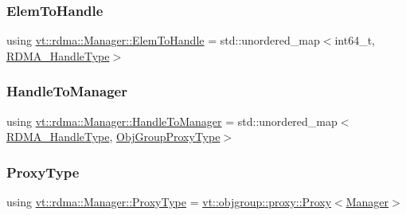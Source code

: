 \mbox{\label{structvt_1_1rdma_1_1_manager_ad794893058cec7595bc2bcb466ce7d3f}} 
\subsubsection{\texorpdfstring{Elem\+To\+Handle}{ElemToHandle}}
{\footnotesize\ttfamily using \hyperlink{structvt_1_1rdma_1_1_manager_ad794893058cec7595bc2bcb466ce7d3f}{vt\+::rdma\+::\+Manager\+::\+Elem\+To\+Handle} =  std\+::unordered\+\_\+map$<$int64\+\_\+t, \hyperlink{namespacevt_a10442579ec4e7ebef223818e64bcf908}{R\+D\+M\+A\+\_\+\+Handle\+Type}$>$}

\mbox{\label{structvt_1_1rdma_1_1_manager_aac6e7c58d320c302ea08461941d65f6e}} 
\subsubsection{\texorpdfstring{Handle\+To\+Manager}{HandleToManager}}
{\footnotesize\ttfamily using \hyperlink{structvt_1_1rdma_1_1_manager_aac6e7c58d320c302ea08461941d65f6e}{vt\+::rdma\+::\+Manager\+::\+Handle\+To\+Manager} =  std\+::unordered\+\_\+map$<$\hyperlink{namespacevt_a10442579ec4e7ebef223818e64bcf908}{R\+D\+M\+A\+\_\+\+Handle\+Type}, \hyperlink{namespacevt_ad7cae989df485fccca57f0792a880a8e}{Obj\+Group\+Proxy\+Type}$>$}

\mbox{\label{structvt_1_1rdma_1_1_manager_a75d5cdc6428ea19f5ec665b04dcd7166}} 
\subsubsection{\texorpdfstring{Proxy\+Type}{ProxyType}}
{\footnotesize\ttfamily using \hyperlink{structvt_1_1rdma_1_1_manager_a75d5cdc6428ea19f5ec665b04dcd7166}{vt\+::rdma\+::\+Manager\+::\+Proxy\+Type} =  \hyperlink{structvt_1_1objgroup_1_1proxy_1_1_proxy}{vt\+::objgroup\+::proxy\+::\+Proxy}$<$\hyperlink{structvt_1_1rdma_1_1_manager}{Manager}$>$}



